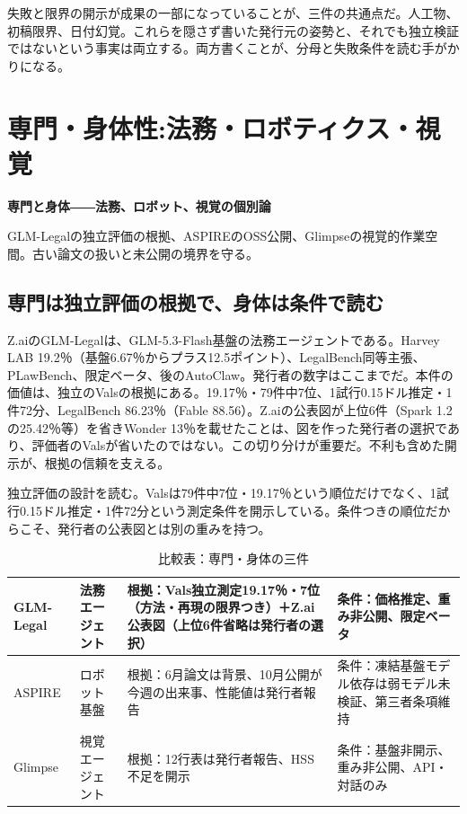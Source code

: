 \documentclass[lualatex,a4paper,10pt]{jlreq}
\begin{document}
失敗と限界の開示が成果の一部になっていることが、三件の共通点だ。人工物、初稿限界、日付幻覚。これらを隠さず書いた発行元の姿勢と、それでも独立検証ではないという事実は両立する。両方書くことが、分母と失敗条件を読む手がかりになる。
\cite{B46,B83,B44,B43,B45,B47,B84,B48}


\section{専門・身体性:法務・ロボティクス・視覚}
\label{sec:P7}

{\Large\bfseries 専門と身体――法務、ロボット、視覚の個別論\par}
\smallskip
{\color{SurveyMuted}GLM-Legalの独立評価の根拠、ASPIREのOSS公開、Glimpseの視覚的作業空間。古い論文の扱いと未公開の境界を守る。\par}
\bigskip

\subsection*{専門は独立評価の根拠で、身体は条件で読む}

Z.aiのGLM-Legalは、GLM-5.3-Flash基盤の法務エージェントである。Harvey LAB 19.2％（基盤6.67％からプラス12.5ポイント）、LegalBench同等主張、PLawBench、限定ベータ、後のAutoClaw。発行者の数字はここまでだ。本件の価値は、独立のValsの根拠にある。19.17％・79件中7位、1試行0.15ドル推定・1件72分、LegalBench 86.23％（Fable 88.56）。Z.aiの公表図が上位6件（Spark 1.2の25.42％等）を省きWonder 13％を載せたことは、図を作った発行者の選択であり、評価者のValsが省いたのではない。この切り分けが重要だ。不利も含めた開示が、根拠の信頼を支える。
\cite{B55,B53,B54}


独立評価の設計を読む。Valsは79件中7位・19.17％という順位だけでなく、1試行0.15ドル推定・1件72分という測定条件を開示している。条件つきの順位だからこそ、発行者の公表図とは別の重みを持つ。
\cite{B55,B53,B54}


\begin{table}[htbp]\centering\footnotesize
\caption{比較表：専門・身体の三件}
\begin{tabularx}{0.96\linewidth}{@{}lXXX@{}}
\toprule
GLM-Legal & 法務エージェント & 根拠：Vals独立測定19.17％・7位（方法・再現の限界つき）＋Z.ai公表図（上位6件省略は発行者の選択） & 条件：価格推定、重み非公開、限定ベータ \cite{B55,B53,B54} \\
\midrule
ASPIRE & ロボット基盤 & 根拠：6月論文は背景、10月公開が今週の出来事、性能値は発行者報告 & 条件：凍結基盤モデル依存は弱モデル未検証、第三者条項維持 \cite{B57,B56} \\
\midrule
Glimpse & 視覚エージェント & 根拠：12行表は発行者報告、HSS不足を開示 & 条件：基盤非開示、重み非公開、API・対話のみ \cite{B58,B59,B88} \\
\bottomrule
\end{tabularx}
\end{table}
\end{document}
